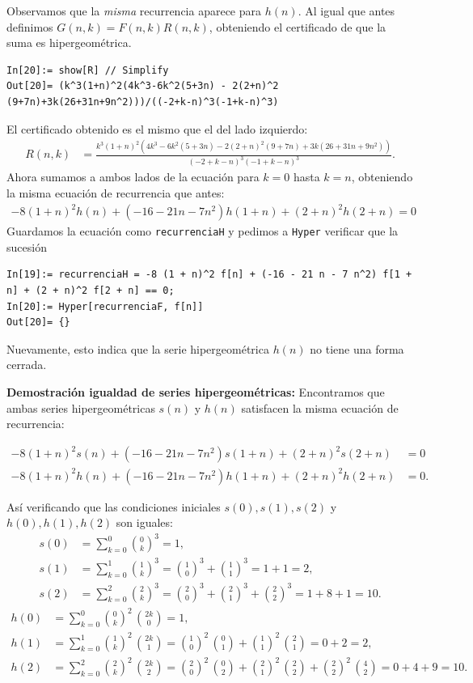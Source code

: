 \begin{solucion}
Observamos que la \emph{misma} recurrencia aparece para $h(n)$. Al igual que antes definimos $G(n,k) = F(n,k) R(n,k)$, obteniendo el certificado de que la suma es hipergeométrica.

\begin{lstlisting}[caption={Verificación de la hipergeometría}]
In[20]:= show[R] // Simplify
Out[20]= (k^3(1+n)^2(4k^3-6k^2(5+3n) - 2(2+n)^2 (9+7n)+3k(26+31n+9n^2)))/((-2+k-n)^3(-1+k-n)^3)
\end{lstlisting}
El certificado obtenido es el mismo que el del lado izquierdo:
\begin{align*}
  R(n,k) &= \frac{k^3(1+n)^2(4k^3-6k^2(5+3n) - 2(2+n)^2 (9+7n)+3k(26+31n+9n^2))}{(-2+k-n)^3(-1+k-n)^3}.
\end{align*}
Ahora sumamos a ambos lados de la ecuación para $k=0$ hasta $k=n$, obteniendo la misma ecuación de recurrencia que antes:
\begin{align*}
    -8 (1+n)^2 h(n)+ (-16-21n-7n^2) h(1+n) + (2+n)^2 h(2+n) = 0
\end{align*}
Guardamos la ecuación como \texttt{recurrenciaH} y pedimos a \texttt{Hyper} verificar que la sucesión

\begin{lstlisting}
In[19]:= recurrenciaH = -8 (1 + n)^2 f[n] + (-16 - 21 n - 7 n^2) f[1 + n] + (2 + n)^2 f[2 + n] == 0;
In[20]:= Hyper[recurrenciaF, f[n]]
Out[20]= {}
\end{lstlisting}
Nuevamente, esto indica que la serie hipergeométrica $h(n)$ no tiene una forma cerrada.

\textbf{Demostración igualdad de series hipergeométricas:}
Encontramos que ambas series hipergeométricas $s(n)$ y $h(n)$ satisfacen la misma ecuación de recurrencia:

\begin{align*}
    -8 (1+n)^2 s(n)+ (-16-21n-7n^2) s(1+n) + (2+n)^2 s(2+n) &= 0 \\
    -8 (1+n)^2 h(n)+ (-16-21n-7n^2) h(1+n) + (2+n)^2 h(2+n) &= 0.
\end{align*}

Así verificando que las condiciones iniciales $s(0),s(1),s(2)$ y $h(0),h(1),h(2)$ son iguales:
\begin{align*}
    s(0) &= \sum_{k=0}^{0} \binom{0}{k}^{3} = 1, \\
    s(1) &= \sum_{k=0}^{1} \binom{1}{k}^{3} =  \binom{1}{0}^{3} + \binom{1}{1}^{3} = 1 + 1 = 2, \\
    s(2) &= \sum_{k=0}^{2} \binom{2}{k}^{3} = \binom{2}{0}^{3} + \binom{2}{1}^{3} + \binom{2}{2}^{3} = 1 + 8 + 1 = 10.
\end{align*}
\begin{align*}
    h(0) &= \sum_{k=0}^{0} \binom{0}{k}^{2} \,\binom{2k}{0} = 1, \\
    h(1) &= \sum_{k=0}^{1} \binom{1}{k}^{2} \,\binom{2k}{1} =  \binom{1}{0}^{2} \,\binom{0}{1} + \binom{1}{1}^{2} \,\binom{2}{1} = 0 + 2 = 2, \\
    h(2) &= \sum_{k=0}^{2} \binom{2}{k}^{2} \,\binom{2k}{2} = \binom{2}{0}^{2} \,\binom{0}{2} + \binom{2}{1}^{2} \,\binom{2}{2} + \binom{2}{2}^{2} \,\binom{4}{2} = 0 + 4 + 9 = 10.
\end{align*}


\end{solucion}
